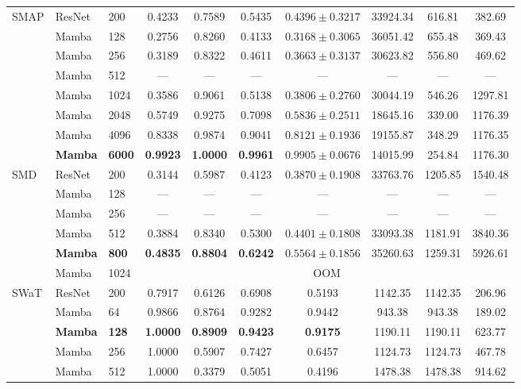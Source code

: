 \documentclass[runningheads]{llncs}
\begin{document}
\begin{table}[H]
{\begin{tabular}{lllccccccc}
\multirow{8}{*}{SMAP}
 & ResNet & 200   & 0.4233 & 0.7589 & 0.5435 & $0.4396\pm0.3217$ & 33924.34 & 616.81 & 382.69 \\
 & Mamba  & 128   & 0.2756 & 0.8260 & 0.4133 & $0.3168\pm0.3065$ & 36051.42 & 655.48 & 369.43 \\
 & Mamba  & 256   & 0.3189 & 0.8322 & 0.4611 & $0.3663\pm0.3137$ & 30623.82 & 556.80 & 469.62 \\
 & Mamba  & 512   & \textsf{---} & \textsf{---} & \textsf{---} & \textsf{---} & \textsf{---} & \textsf{---} & \textsf{---} \\
 & Mamba  & 1024  & 0.3586 & 0.9061 & 0.5138 & $0.3806\pm0.2760$ & 30044.19 & 546.26 & 1297.81 \\
 & Mamba  & 2048  & 0.5749 & 0.9275 & 0.7098 & $0.5836\pm0.2511$ & 18645.16 & 339.00 & 1176.39 \\
 & Mamba  & 4096  & 0.8338 & 0.9874 & 0.9041 & $0.8121\pm0.1936$ & 19155.87 & 348.29 & 1176.35 \\
 & \textbf{Mamba}  & \textbf{6000}  & \textbf{0.9923} & \textbf{1.0000} & \textbf{0.9961} & $\mathbf{0.9905\pm0.0676}$ & 14015.99 & 254.84 & 1176.30 \\
\midrule

\multirow{6}{*}{SMD}
 & ResNet & 200   & 0.3144 & 0.5987 & 0.4123 & $0.3870\pm0.1908$ & 33763.76 & 1205.85 & 1540.48 \\
 & Mamba  & 128   & \textsf{---} & \textsf{---} & \textsf{---} & \textsf{---} & \textsf{---} & \textsf{---} & \textsf{---} \\
 & Mamba  & 256   & \textsf{---} & \textsf{---} & \textsf{---} & \textsf{---} & \textsf{---} & \textsf{---} & \textsf{---} \\
 & Mamba  & 512   & 0.3884 & 0.8340 & 0.5300 & $0.4401\pm0.1808$ & 33093.38 & 1181.91 & 3840.36 \\
 & \textbf{Mamba}  & \textbf{800}   & \textbf{0.4835} & \textbf{0.8804} & \textbf{0.6242} & $\mathbf{0.5564\pm0.1856}$ & 35260.63 & 1259.31 & 5926.61 \\
 & Mamba  & 1024  & \multicolumn{7}{c}{\textsf{OOM}} \\
\midrule

\multirow{5}{*}{SWaT}
 & ResNet & 200   & 0.7917 & 0.6126 & 0.6908 & 0.5193 & 1142.35 & 1142.35 & 206.96 \\
 & Mamba  & 64    & 0.9866 & 0.8764 & 0.9282 & 0.9442 &  943.38 &  943.38 & 189.02 \\
 & \textbf{Mamba}  & \textbf{128}   & \textbf{1.0000} & \textbf{0.8909} & \textbf{0.9423} & \textbf{0.9175} & 1190.11 & 1190.11 & 623.77 \\
 & Mamba  & 256   & 1.0000 & 0.5907 & 0.7427 & 0.6457 & 1124.73 & 1124.73 & 467.78 \\
 & Mamba  & 512   & 1.0000 & 0.3379 & 0.5051 & 0.4196 & 1478.38 & 1478.38 & 914.62 \\
\midrule


\end{tabular}}
\end{table}
\end{document}

